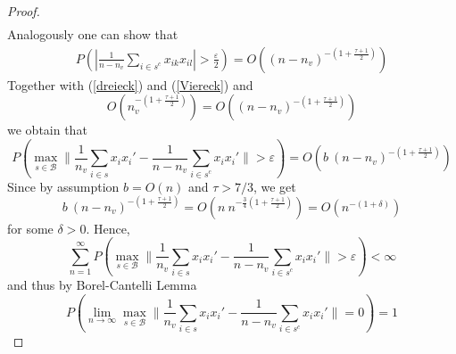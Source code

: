 \documentclass[Research_Module_ES.tex]{subfiles}
\begin{document}
\begin{proof}
\begin{align*}
\end{align*}
Analogously one can show that
\begin{align*}
P\left(\left| \frac{1}{n-n_v}\sum_{i\in s^c}x_{ik}x_{il}\right|>\frac{\varepsilon}{2}\right)=O\left((n-n_v)^{-\left(1+\frac{\tau+1}{2}\right)}\right)
\end{align*}
Together with (\ref{dreieck}) and (\ref{Viereck}) and 
\[
	O\left(n_v^{-\left(1+\frac{\tau+1}{2}\right)}\right)=O\left((n-n_v)^{-\left(1+\frac{\tau+1}{2}\right)}\right)
\]
we obtain that
\[
	P\left( \max_{s\in \mathcal{B}}\biggl\lVert \frac{1}{n_v}\sum_{i\in s}x_ix_i' - \frac{1}{n-n_v}\sum_{i\in s^c}x_ix_i'\biggr\rVert>\varepsilon\right)=O\left(b~(n-n_v)^{-\left(1+\frac{\tau+1}{2}\right)}\right)
\]
Since by assumption $b=O(n)$ and $\tau>7/3$, we get 
\[
	b~(n-n_v)^{-\left(1+\frac{\tau+1}{2}\right)}=O\left(n~n^{-\frac{3}{4}\left(1+\frac{\tau+1}{2}\right)}\right)=O\left(n^{-(1+\delta)}\right)
\]
for some $\delta>0$. Hence,
\[
	\sum_{n=1}^{\infty}P\left( \max_{s\in \mathcal{B}}\biggl\lVert \frac{1}{n_v}\sum_{i\in s}x_ix_i' - \frac{1}{n-n_v}\sum_{i\in s^c}x_ix_i'\biggr\rVert>\varepsilon\right)<\infty
\]
and thus by Borel-Cantelli Lemma
\[
	P\left(\lim_{n\to\infty} \max_{s\in \mathcal{B}}\biggl\lVert \frac{1}{n_v}\sum_{i\in s}x_ix_i' - \frac{1}{n-n_v}\sum_{i\in s^c}x_ix_i'\biggr\rVert =0\right)=1
\]
\end{proof}
\end{document}
